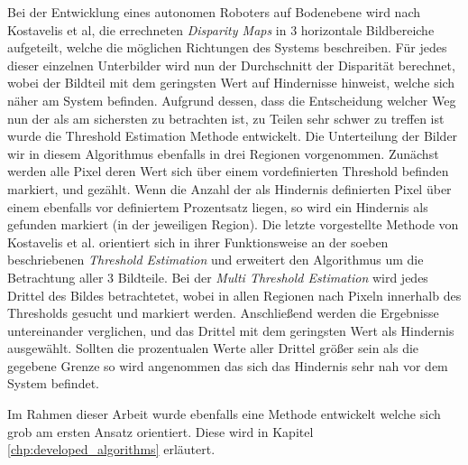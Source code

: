 \noindent
Bei der Entwicklung eines autonomen Roboters auf Bodenebene wird nach Kostavelis et al, \cite{kostavelis2010comparative} die errechneten \emph{Disparity Maps} in 3 horizontale Bildbereiche aufgeteilt, welche die möglichen Richtungen des Systems beschreiben. Für jedes dieser einzelnen Unterbilder wird nun der Durchschnitt der Disparität berechnet, wobei der Bildteil mit dem geringsten Wert auf Hindernisse hinweist, welche sich näher am System befinden. Aufgrund dessen, dass die Entscheidung welcher Weg nun der als am sichersten zu betrachten ist, zu Teilen sehr schwer zu treffen ist wurde die Threshold Estimation Methode entwickelt.
Die Unterteilung der Bilder wir in diesem Algorithmus ebenfalls in drei Regionen vorgenommen. Zunächst werden alle Pixel deren Wert sich über einem vordefinierten Threshold befinden markiert, und gezählt. Wenn die Anzahl der als Hindernis definierten Pixel über einem ebenfalls vor definiertem Prozentsatz liegen, so wird ein Hindernis als gefunden markiert (in der jeweiligen Region). Die letzte vorgestellte Methode von Kostavelis et al. orientiert sich in ihrer Funktionsweise an der soeben beschriebenen \emph{Threshold Estimation} und erweitert den Algorithmus um die Betrachtung aller 3 Bildteile.
Bei der \emph{Multi Threshold Estimation} wird jedes Drittel des Bildes betrachtetet, wobei in allen Regionen nach Pixeln innerhalb des Thresholds gesucht und markiert werden. Anschließend werden die Ergebnisse untereinander verglichen, und das Drittel mit dem geringsten Wert als Hindernis ausgewählt. Sollten die prozentualen Werte aller Drittel größer sein als die gegebene Grenze so wird angenommen das sich das Hindernis sehr nah vor dem System befindet.

Im Rahmen dieser Arbeit wurde ebenfalls eine Methode entwickelt welche sich grob am ersten Ansatz orientiert. Diese wird in Kapitel \ref{chp:developed_algorithms} erläutert.\\

